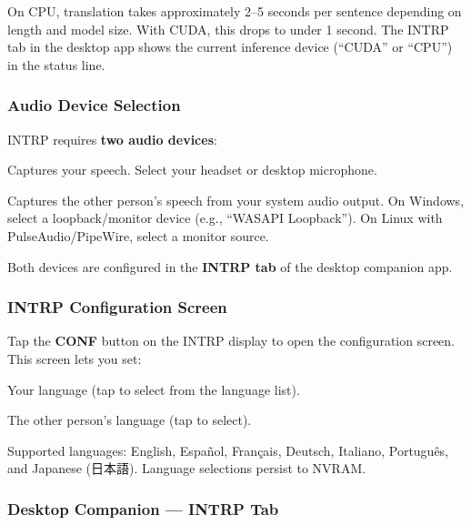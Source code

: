 \documentclass[10pt]{article}
\begin{document}
\noindent On CPU, translation takes approximately 2--5 seconds per sentence depending on length and model size. With CUDA, this drops to under 1 second. The INTRP tab in the desktop app shows the current inference device (``CUDA'' or ``CPU'') in the status line.

\subsubsection{Audio Device Selection}

INTRP requires \textbf{two audio devices}:

\begin{description}[style=nextline, leftmargin=1em, font=\bfseries\ttfamily, nosep]
  \item[Microphone] Captures your speech. Select your headset or desktop microphone.
  \item[System Loopback] Captures the other person's speech from your system audio output. On Windows, select a loopback/monitor device (e.g., ``WASAPI Loopback''). On Linux with PulseAudio/PipeWire, select a monitor source.
\end{description}

\noindent Both devices are configured in the \textbf{INTRP tab} of the desktop companion app.

\subsubsection{INTRP Configuration Screen}

Tap the \textbf{CONF} button on the INTRP display to open the configuration screen. This screen lets you set:

\begin{description}[style=nextline, leftmargin=1em, font=\bfseries\ttfamily, nosep]
  \item[I SPEAK] Your language (tap to select from the language list).
  \item[THEY SPEAK] The other person's language (tap to select).
\end{description}

\noindent Supported languages: English, Espa\~{n}ol, Fran\c{c}ais, Deutsch, Italiano, Portugu\^{e}s, and Japanese (日本語). Language selections persist to NVRAM.

\subsubsection{Desktop Companion --- INTRP Tab}
\end{document}
